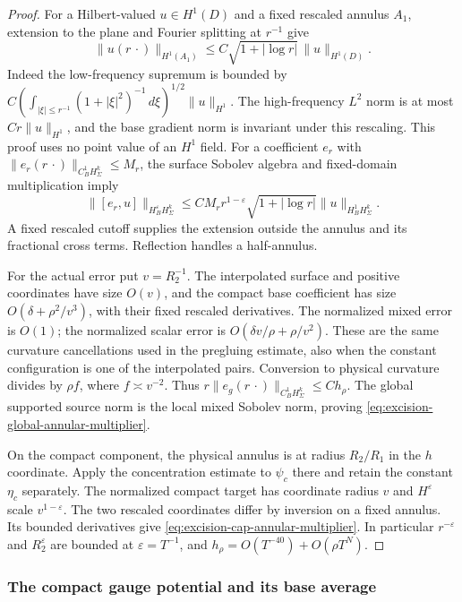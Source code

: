 \documentclass[11pt]{amsart}
\theoremstyle{definition}
\theoremstyle{remark}
\theoremstyle{plain}
\begin{document}
\begin{proof}
For a Hilbert-valued $u\in H^1(D)$ and a fixed rescaled annulus
$A_1$, extension to the plane and Fourier splitting at $r^{-1}$
give
\[
 \|u(r\,\cdot)\|_{H^1(A_1)}
                  \leq C\sqrt{1+|\log r|}\,\|u\|_{H^1(D)}.
\]
Indeed the low-frequency supremum is bounded by
$C(\int_{|\xi|\leq r^{-1}}(1+|\xi|^2)^{-1}\,d\xi)^{1/2}\|u\|_{H^1}$.
The high-frequency $L^2$ norm is at most $Cr\|u\|_{H^1}$,
and the base gradient norm is invariant under this rescaling.
This proof uses no point value of an $H^1$ field.
For a coefficient $e_r$ with
$\|e_r(r\,\cdot)\|_{C^1_BH^k_\Sigma}\leq M_r$, the surface
Sobolev algebra and fixed-domain multiplication imply
\[
 \|[e_r,u]\|_{H^\varepsilon_BH^k_\Sigma}
 \leq CM_rr^{1-\varepsilon}\sqrt{1+|\log r|}
                                      \|u\|_{H^1_BH^k_\Sigma}.
\]
A fixed rescaled cutoff supplies the extension outside the annulus
and its fractional cross terms. Reflection handles a half-annulus.

For the actual error put $v=R_2^{-1}$. The interpolated surface
and positive coordinates have size $O(v)$, and the compact
base coefficient has size $O(\delta+\rho^2/v^3)$, with their
fixed rescaled derivatives. The normalized mixed error is
$O(1)$; the normalized scalar error is
$O(\delta v/\rho+\rho/v^2)$. These are the same curvature
cancellations used in the pregluing estimate, also when the
constant configuration is one of the interpolated pairs.
Conversion to physical curvature divides by $\rho f$, where
$f\asymp v^{-2}$. Thus
$r\|e_g(r\,\cdot)\|_{C^1_BH^k_\Sigma}\leq Ch_\rho$.
The global supported source norm is the local mixed Sobolev
norm, proving \eqref{eq:excision-global-annular-multiplier}.

On the compact component, the physical annulus is at radius
$R_2/R_1$ in the $h$ coordinate. Apply the concentration
estimate to $\psi_c$ there and retain the constant $\eta_c$
separately. The normalized compact target has coordinate
radius $v$ and $H^\varepsilon$ scale $v^{1-\varepsilon}$.
The two rescaled coordinates differ by inversion on a fixed
annulus. Its bounded derivatives give
\eqref{eq:excision-cap-annular-multiplier}.
In particular
$r^{-\varepsilon}$ and $R_2^\varepsilon$ are bounded at
$\varepsilon=T^{-1}$, and $h_\rho=O(T^{-40})+O(\rho T^N)$.
\end{proof}

\subsubsection{The compact gauge potential and its base average}
\end{document}
